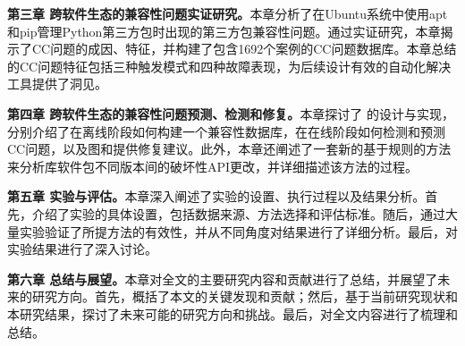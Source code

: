 \textbf{第三章 跨软件生态的兼容性问题实证研究。}本章分析了在Ubuntu系统中使用apt和pip管理Python第三方包时出现的第三方包兼容性问题。通过实证研究，本章揭示了CC问题的成因、特征，并构建了包含1692个案例的CC问题数据库。本章总结的CC问题特征包括三种触发模式和四种故障表现，为后续设计有效的自动化解决工具提供了洞见。

\textbf{第四章 跨软件生态的兼容性问题预测、检测和修复。}本章探讨了 \tool{}的设计与实现，分别介绍了\tool{}在离线阶段如何构建一个兼容性数据库，在在线阶段如何检测和预测CC问题，以及图和提供修复建议。此外，本章还阐述了一套新的基于规则的方法来分析库软件包不同版本间的破坏性API更改，并详细描述该方法的过程。


\textbf{第五章 实验与评估。}本章深入阐述了实验的设置、执行过程以及结果分析。首先，介绍了实验的具体设置，包括数据来源、方法选择和评估标准。随后，通过大量实验验证了所提方法的有效性，并从不同角度对结果进行了详细分析。最后，对实验结果进行了深入讨论。

\textbf{第六章 总结与展望。}本章对全文的主要研究内容和贡献进行了总结，并展望了未来的研究方向。首先，概括了本文的关键发现和贡献；然后，基于当前研究现状和本研究结果，探讨了未来可能的研究方向和挑战。最后，对全文内容进行了梳理和总结。


